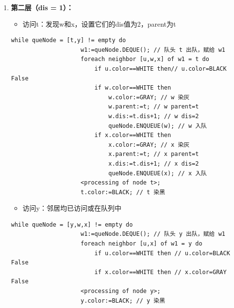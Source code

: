 \documentclass{article}
\begin{document}
\begin{enumerate}
    \pagebreak

    \item \textbf{第二层（dis = 1）：}

        \begin{itemize}
            \item 访问t：发现w和x，设置它们的dis值为2，parent为t
       
        \end{itemize}

        \begin{lstlisting}[style=algorithmPPT]
                while queNode = [t,y] != empty do 
                    w1:=queNode.DEQUE(); // 队头 t 出队，赋给 w1
                    foreach neighbor [u,w,x] of w1 = t do
                        if u.color==WHITE then// u.color=BLACK False
                        if w.color==WHITE then
                            w.color:=GRAY; // w 染灰
                            w.parent:=t; // w parent=t
                            w.dis:=t.dis+1; // w dis=2
                            queNode.ENQUEUE(w); // w 入队
                        if x.color==WHITE then
                            x.color:=GRAY; // x 染灰
                            x.parent:=t; // x parent=t
                            x.dis:=t.dis+1; // x dis=2
                            queNode.ENQUEUE(x); // x 入队
                    <processing of node t>;
                    t.color:=BLACK; // t 染黑
                \end{lstlisting}    
        \begin{itemize}
            \item 访问y：邻居均已访问或在队列中
        \end{itemize}


        \begin{lstlisting}[style=algorithmPPT]
                while queNode = [y,w,x] != empty do
                    w1:=queNode.DEQUE(); // 队头 y 出队，赋给 w1
                    foreach neighbor [u,x] of w1 = y do 
                        if u.color==WHITE then // u.color=BLACK False
                        if x.color==WHITE then // x.color=GRAY False
                    <processing of node y>;
                    y.color:=BLACK; // y 染黑        
                \end{lstlisting}  
        \begin{figure}[htbp]
            \begin{minipage}[b]{0.6\textwidth}    %
                \centering
                    \begin{tikzpicture}[
                        scale=1.5,
                        node distance=2.5cm,
                        every node/.style={
                            circle, 
                            draw, 
                            minimum size=2em,
                            inner sep=4pt,
                            font=\large
                        }
                    ]
                        

\end{tikzpicture}
\end{minipage}
\end{figure}
\end{enumerate}
\end{document}
